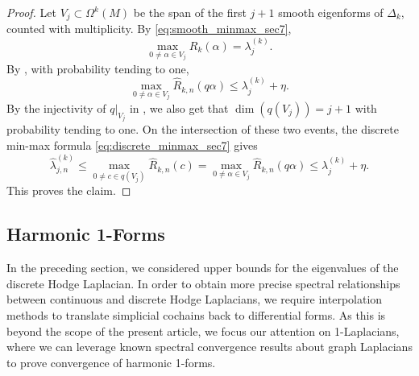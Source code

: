 \documentclass[11pt,reqno]{amsproc}
\numberwithin{equation}{section}
\theoremstyle{definition}
\theoremstyle{plain}
\begin{document}
    \begin{proof}
    Let $V_j\subset \Omega^k(M)$ be the span of the first $j+1$ smooth eigenforms of $\Delta_k$, counted with multiplicity.  By \eqref{eq:smooth_minmax_sec7},
    \[
        \max_{0\neq \alpha\in V_j}R_k(\alpha)=\lambda^{(k)}_j.
    \]
    By , with probability tending to one,
    \[
        \max_{0\neq \alpha\in V_j}\widehat R_{k,n}(q\alpha)
        \leq
        \lambda^{(k)}_j+\eta.
    \]
    By the injectivity of $q|_{V_j}$ in , we also get that $\dim(q(V_j)) = j+1$ with probability tending to one.
    On the intersection of these two events, the discrete min-max formula \eqref{eq:discrete_minmax_sec7} gives
    \[
        \widehat\lambda^{(k)}_{j,n}
        \leq
        \max_{0\neq c\in q(V_j)}\widehat R_{k,n}(c)
        =
        \max_{0\neq \alpha\in V_j}\widehat R_{k,n}(q\alpha)
        \leq
        \lambda^{(k)}_j+\eta.
    \]
    This proves the claim.
    \end{proof}

    \subsection{Harmonic 1-Forms} \label{ssec:harmonic_1_forms}
    In the preceding section, we considered upper bounds for the eigenvalues of the discrete Hodge Laplacian. In order to obtain more precise spectral relationships between continuous and discrete Hodge Laplacians, we require interpolation methods to translate simplicial cochains back to differential forms. As this is beyond the scope of the present article, we focus our attention on 1-Laplacians, where we can leverage known spectral convergence results about graph Laplacians to prove convergence of harmonic 1-forms. 
    
\end{document}
